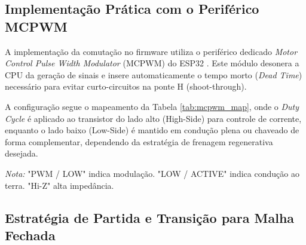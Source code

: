 \documentclass[12pt, a4paper, openright, oneside, brazilian]{abntex2}
\begin{document}
\subsection{Implementação Prática com o Periférico MCPWM}
A implementação da comutação no firmware utiliza o periférico dedicado \textit{Motor Control Pulse Width Modulator} (MCPWM) do ESP32 \cite{esp32-technical-reference-manual}. Este módulo desonera a CPU da geração de sinais e insere automaticamente o tempo morto (\textit{Dead Time}) necessário para evitar curto-circuitos na ponte H (shoot-through).

A configuração segue o mapeamento da Tabela \ref{tab:mcpwm_map}, onde o \textit{Duty Cycle} é aplicado ao transistor do lado alto (High-Side) para controle de corrente, enquanto o lado baixo (Low-Side) é mantido em condução plena ou chaveado de forma complementar, dependendo da estratégia de frenagem regenerativa desejada.

\begin{table}[H]
    \centering
    \caption{Mapeamento dos Estados de Comutação para os Geradores MCPWM do ESP32}
    \label{tab:mcpwm_map}
    \flushleft
    \footnotesize{\textit{Nota:} "PWM / LOW" indica modulação. "LOW / ACTIVE" indica condução ao terra. "Hi-Z" alta impedância.} 
\end{table}

\subsection{Estratégia de Partida e Transição para Malha Fechada}
\end{document}
